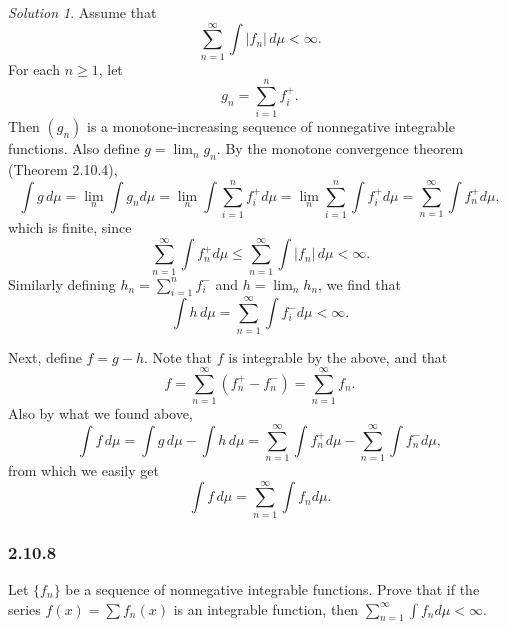 \documentclass{report}
\theoremstyle{remark}
\newtheorem*{solution}{Solution}
\begin{document}
\begin{solution}
  Assume that
  \begin{equation*}
    \sum_{n=1}^\infty \int |f_n| \, d\mu < \infty.
  \end{equation*}
  For each $n \ge 1$, let
  \begin{equation*}
    g_n = \sum_{i=1}^n f_i^+.
  \end{equation*}
  Then $(g_n)$ is a monotone-increasing sequence of nonnegative integrable functions. Also define $g = \lim_n g_n$. By the monotone convergence theorem (Theorem 2.10.4),
  \begin{equation*}
    \int g \, d\mu = \lim_n \int g_n d\mu = \lim_n \int \sum_{i=1}^n f_i^+ d\mu = \lim_n \sum_{i=1}^n \int f_i^+ d\mu = \sum_{n=1}^\infty \int f_n^+ d\mu,
  \end{equation*}
  which is finite, since
  \begin{equation*}
    \sum_{n=1}^\infty \int f_n^+ d\mu \le \sum_{n=1}^\infty \int |f_n| \, d\mu < \infty.
  \end{equation*}
  Similarly defining $h_n = \sum_{i=1}^n f_i^-$ and $h = \lim_n h_n$, we find that 
  \begin{equation*}
    \int h \, d\mu = \sum_{n=1}^\infty \int f_i^- d\mu < \infty.
  \end{equation*}
  
  Next, define $f = g - h$. Note that $f$ is integrable by the above, and that
  \begin{equation*}
    f = \sum_{n=1}^\infty (f_n^+ - f_n^-) = \sum_{n=1}^\infty f_n.
  \end{equation*}
  Also by what we found above,
  \begin{equation*}
    \int f \, d\mu = \int g \, d\mu - \int h \, d\mu = \sum_{n=1}^\infty \int f_n^+ d\mu - \sum_{n=1}^\infty \int f_n^- d\mu,
  \end{equation*}
  from which we easily get
  \begin{equation*}
    \int f \, d\mu = \sum_{n=1}^\infty \int f_n d\mu.
  \end{equation*}
\end{solution}

\subsubsection*{2.10.8}
Let $\{f_n\}$ be a sequence of nonnegative integrable functions. Prove that if the series $f(x) = \sum f_n(x)$ is an integrable function, then $\sum_{n=1}^\infty \int f_n d\mu < \infty$.
\end{document}
